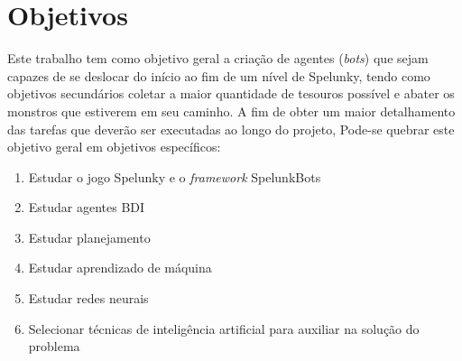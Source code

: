 \chapter{\label{chap:objectives}Objetivos}
Este trabalho tem como objetivo geral a criação de agentes (\textit{bots}) que
sejam capazes de se deslocar do início ao fim de um nível de Spelunky, tendo
como objetivos secundários coletar a maior quantidade de tesouros possível e
abater os monstros que estiverem em seu caminho.  A fim de obter um maior
detalhamento das tarefas que deverão ser executadas ao longo do projeto,
Pode-se quebrar este objetivo geral em objetivos específicos:

\begin{enumerate}
    \item Estudar o jogo Spelunky  e o \textit{framework} SpelunkBots

	\item Estudar agentes BDI

	\item Estudar planejamento

	\item Estudar aprendizado de máquina

	\item Estudar redes neurais

	\item Selecionar técnicas de inteligência artificial para auxiliar na
	solução do problema

\end{enumerate}
